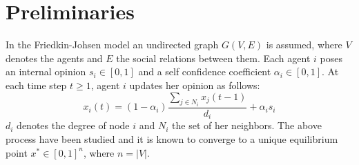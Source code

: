 \section{Preliminaries}

In the Friedkin-Johsen model an undirected graph $G(V,E)$ is assumed, where $V$
denotes the agents and $E$ the social relations between them. Each agent $i$
poses an internal opinion $s_i \in [0,1]$ and a self confidence coefficient
$\alpha_i \in[0,1]$. At each time step $t\geq 1$, agent $i$ updates her opinion
as follows: $$x_i(t) = (1-\alpha_i) \frac{\sum_{j \in N_i}x_j(t-1)}{d_i} +
\alpha_i s_i$$ $d_i$ denotes the degree of node $i$ and $N_i$ the set of her
neighbors. The above process have been studied and it is known to converge to a
unique equilibrium point $x^* \in [0,1]^n$, where $n=|V|$.
